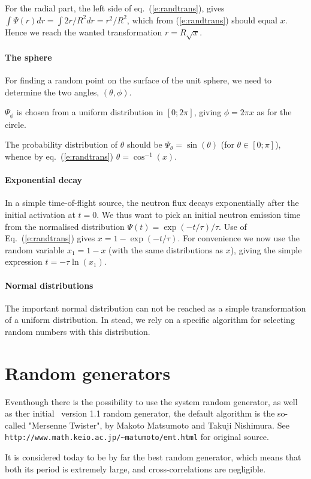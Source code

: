 For the radial part, the left side of eq.~(\ref{e:randtrans}), gives
$\int \Psi(r) dr = \int 2 r/R^2 dr = r^2/R^2$,
which from (\ref{e:randtrans}) should equal $x$.
Hence we reach the wanted transformation $r = R\sqrt{x}$.

\paragraph{The sphere}
For finding a random point on the surface of the unit sphere,
we need to determine the two angles, $(\theta, \phi)$.

$\Psi_\phi$ is chosen from a uniform distribution
in $[0; 2\pi]$, giving $\phi = 2\pi x$ as for the circle.

The probability distribution of $\theta$ should be
$\Psi_\theta=\sin(\theta)$ (for $\theta \in [0; \pi ]$),
whence by eq.~(\ref{e:randtrans}) $\theta=\cos^{-1}(x)$.

\paragraph{Exponential decay}
In a simple time-of-flight source, the neutron flux decays exponentially
after the initial activation at $t=0$. We thus want to pick an initial
neutron emission time from the normalised distribution
$\Psi(t) = \exp(-t/\tau) / \tau$.
Use of Eq.~(\ref{e:randtrans}) gives
$x = 1 - \exp(-t/\tau)$. For convenience we now use the random variable
$x_1 = 1-x$ (with the same distributions as $x$),
giving the simple expression $t = - \tau \ln (x_1)$.

\paragraph{Normal distributions}
The important normal distribution can not be reached as a simple
transformation of a uniform distribution.
In stead, we rely on a specific algorithm for selecting random
numbers with this distribution.

\section{Random generators}
Eventhough there is the possibility to use the system random generator, as well as ther initial \MCS\ version 1.1 random generator, the default algorithm is the so-called "Mersenne Twister", by Makoto Matsumoto and Takuji Nishimura. See \verb+http://www.math.keio.ac.jp/~matumoto/emt.html+ for original source.

It is considered today to be by far the best random generator, which means that both its period is extremely large, and cross-correlations are negligible.